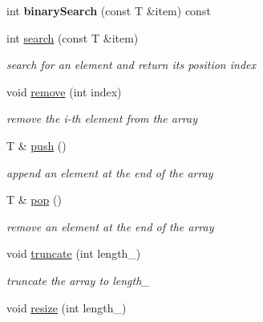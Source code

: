 \begin{DoxyCompactItemize}
\item 
int {\bfseries binary\+Search} (const T \&item) const \hypertarget{class_i_dream_sky_1_1_array_ad5ef454390784dd151d5136b004ae926}{}\label{class_i_dream_sky_1_1_array_ad5ef454390784dd151d5136b004ae926}

\item 
int \hyperlink{class_i_dream_sky_1_1_array_aba0866ecd815a1c20989c7d36e7f35c2}{search} (const T \&item)
\begin{DoxyCompactList}\small\item\em search for an element and return its position index \end{DoxyCompactList}\item 
void \hyperlink{class_i_dream_sky_1_1_array_a6b2e311cffc7a53878d8793c29f4752c}{remove} (int index)
\begin{DoxyCompactList}\small\item\em remove the i-\/th element from the array \end{DoxyCompactList}\item 
T \& \hyperlink{class_i_dream_sky_1_1_array_a1a01a5087c38bab73d23c6eebf7b90ab}{push} ()
\begin{DoxyCompactList}\small\item\em append an element at the end of the array \end{DoxyCompactList}\item 
T \& \hyperlink{class_i_dream_sky_1_1_array_afbe68e4b0bacf1d5c6427a0d72aa7297}{pop} ()
\begin{DoxyCompactList}\small\item\em remove an element at the end of the array \end{DoxyCompactList}\item 
void \hyperlink{class_i_dream_sky_1_1_array_aea69517fa475fef5ab373a86ddec86e1}{truncate} (int length\+\_\+)\hypertarget{class_i_dream_sky_1_1_array_aea69517fa475fef5ab373a86ddec86e1}{}\label{class_i_dream_sky_1_1_array_aea69517fa475fef5ab373a86ddec86e1}

\begin{DoxyCompactList}\small\item\em truncate the array to length\+\_\+ \end{DoxyCompactList}\item 
void \hyperlink{class_i_dream_sky_1_1_array_a5971093e68fc1c1fb7e8922b75d59833}{resize} (int length\+\_\+)\hypertarget{class_i_dream_sky_1_1_array_a5971093e68fc1c1fb7e8922b75d59833}{}\label{class_i_dream_sky_1_1_array_a5971093e68fc1c1fb7e8922b75d59833}


\end{DoxyCompactItemize}
